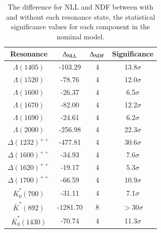 \begin{table}[h]
    \centering
    \caption{The difference for NLL and NDF between with and without each resonance state, the statistical significance values for each component in the nominal model.}
    \label{tab:nom_significance}
    \begin{tabular}{cccc}
        \hline\hline
    Resonance & $\Delta_{\rm NLL}$ & $\Delta_{\rm NDF}$ & Significance \\\hline
    $\Lambda(1405)$ & -103.29 & 4 & 13.8$\sigma$\\
    $\Lambda(1520)$ & -78.76 & 4 & 12.0$\sigma$\\
    $\Lambda(1600)$ & -26.37 & 4 & 6.5$\sigma$\\
    $\Lambda(1670)$ & -82.00 & 4 & 12.2$\sigma$\\
    $\Lambda(1690)$ & -24.61 & 4 & 6.2$\sigma$\\
    $\Lambda(2000)$ & -256.98 & 4 & 22.3$\sigma$\\
    $\Delta(1232)^{++}$ & -477.81 & 4 & 30.6$\sigma$\\
    $\Delta(1600)^{++}$ & -34.93 & 4 & 7.6$\sigma$\\
    $\Delta(1620)^{++}$ & -19.17 & 4 & 5.3$\sigma$\\
    $\Delta(1700)^{++}$ & -66.59 & 4 & 10.9$\sigma$\\
    $\bar{K}^{*}_{0}(700)$ & -31.11 & 4 & 7.1$\sigma$\\
    $\bar{K}^{*}(892)$ & -1281.70 & 8 & $>30\sigma$\\
    $\bar{K}^{*}_{0}(1430)$ & -70.74 & 4 & 11.3$\sigma$\\
    \hline\hline
    \end{tabular}
\end{table}

